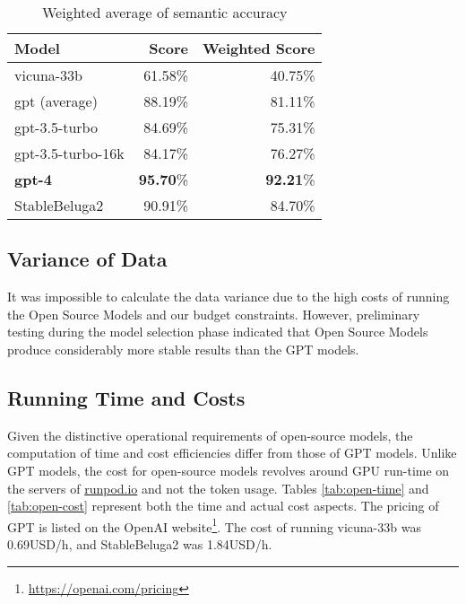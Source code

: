 \begin{table}[htpb]
  \centering
  \begin{tabular}{lrr}
    \hline
    Model & Score & Weighted Score \\
    \hline
    vicuna-33b & 61.58\% & 40.75\% \\
    gpt (average) & 88.19\% & 81.11\% \\
    gpt-3.5-turbo & 84.69\% & 75.31\% \\
    gpt-3.5-turbo-16k & 84.17\% & 76.27\% \\
    \textbf{gpt-4} & \textbf{95.70}\% & \textbf{92.21}\% \\
    StableBeluga2 & 90.91\% & 84.70\% \\
    \hline
  \end{tabular}
  \caption[Semantic Accuracy]{Weighted average of semantic accuracy}
  \label{tab:open-semantic-accuracy}
\end{table}

\subsection{Variance of Data}
It was impossible to calculate the data variance due to the high costs of running the Open Source Models and our budget constraints. However, preliminary testing during the model selection phase indicated that Open Source Models produce considerably more stable results than the GPT models.

\subsection{Running Time and Costs}
Given the distinctive operational requirements of open-source models, the computation of time and cost efficiencies differ from those of GPT models. Unlike GPT models, the cost for open-source models revolves around GPU run-time on the servers of \href{https://runpod.io}{runpod.io} and not the token usage. Tables \ref{tab:open-time} and \ref{tab:open-cost} represent both the time and actual cost aspects. The pricing of GPT is listed on the OpenAI website\footnote{\url{https://openai.com/pricing}}. The cost of running vicuna-33b was 0.69USD/h, and StableBeluga2 was 1.84USD/h.

